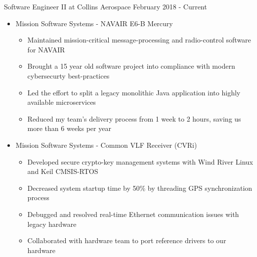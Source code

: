 Software Engineer II at Collins Aerospace
\hfill
February 2018 - Current
\begin{itemize}
    \item Mission Software Systems - NAVAIR E6-B Mercury
    \begin{itemize}
			\item Maintained mission-critical message-processing and radio-control software for NAVAIR
			\item Brought a 15 year old software project into compliance with modern cybersecurty best-practices
			\item Led the effort to split a legacy monolithic Java application into highly available microservices
			\item Reduced my team's delivery process from 1 week to 2 hours, saving us more than 6 weeks per year
    \end{itemize}
	\item Mission Software Systems - Common VLF Receiver (CVRi)
    \begin{itemize}
			\item Developed secure crypto-key management systems with Wind River Linux and Keil CMSIS-RTOS
			\item Decreased system startup time by 50\% by threading GPS synchronization process
			\item Debugged and resolved real-time Ethernet communication issues with legacy hardware 
			\item Collaborated with hardware team to port reference drivers to our hardware
		\end{itemize}
\end{itemize}
